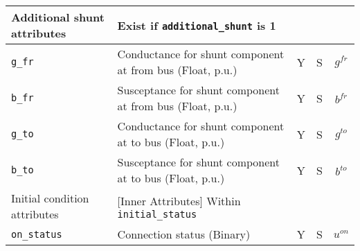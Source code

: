 \documentclass{article}
\begin{document}
\begin{center}
\begin{tabular}{ l | l | c | c | c | }
  \hline
  Additional shunt attributes & Exist if {\tt additional\_shunt} is 1 &  & & \\
  \hline
  {\tt g\_fr} & Conductance for shunt component at from bus (Float, p.u.)& Y & S & $g^{fr}$\\
  {\tt b\_fr} & Susceptance for shunt component at from bus (Float, p.u.)& Y & S & $b^{fr}$\\
  {\tt g\_to} & Conductance for shunt component at to bus (Float, p.u.)& Y & S & $g^{to}$\\
  {\tt b\_to} & Susceptance for shunt component at to bus (Float, p.u.)& Y & S & $b^{to}$\\
  \hline
  Initial condition attributes & [Inner Attributes] Within {\tt initial\_status} & & & \\
  \hline
  {\tt on\_status} & Connection status (Binary) & Y & S & $u^{on}$ \\
  \hline
\end{tabular}
\end{center}


\end{document}
